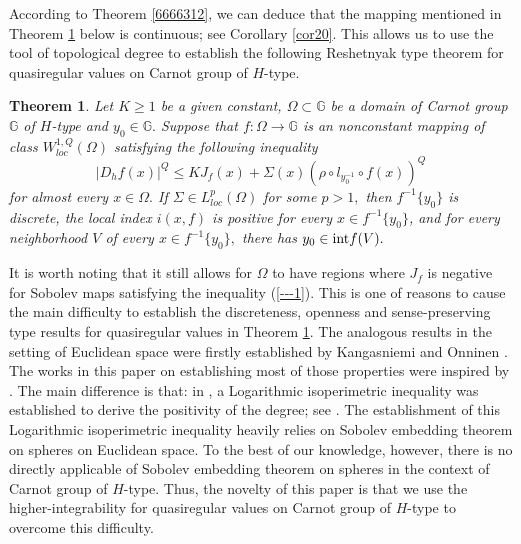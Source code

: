 \documentclass[11pt,twoside]{article}
\newtheorem{thm}{Theorem}[section]
\theoremstyle{definition}
\theoremstyle{remark}
\begin{document}
   According to Theorem \ref{6666312}, we can deduce that the mapping mentioned in Theorem \ref{00990099199} below is continuous; see Corollary \ref{cor20}.   This allows us to use the tool of topological degree
  to establish the following Reshetnyak type theorem for quasiregular values on Carnot group of $H$-type. 
  \begin{thm}\label{00990099199}
Let $K\geq1$ be a given constant, $\Omega\subset\mathbb{G}$ be a domain of Carnot group $\mathbb{G}$ of $H$-type  and $y_{0}\in\mathbb{G}.$ Suppose that $f:\Omega\rightarrow \mathbb{G}$ is an nonconstant mapping of class $W_{loc}^{1,Q}(\Omega)$  satisfying  the following inequality
\begin{equation}\label{---1}
\vert D_{h}f(x)\vert^{Q}\leq KJ_{f}(x)+\Sigma(x)(\rho\circ l_{y_{0}^{-1}}\circ f(x))^{Q}
\end{equation}
for almost every $x\in\Omega.$ If $\Sigma\in L_{loc}^{p}(\Omega)$ for some $p>1,$  then $f^{-1}\{y_{0}\}$ is discrete, the local index $i(x,f)$ is positive for every $x\in f^{-1}\{y_{0}\}$, and for every neighborhood $V$ of every  $x\in f^{-1}\{y_{0}\},$  there has $y_{0}\in {\rm int}f(V).$
\end{thm}
It is worth noting that  it still allows for $\Omega$ to have regions where $J_{f}$  is negative for Sobolev maps satisfying the inequality (\ref{---1}). This is one of reasons to cause the main difficulty to establish the discreteness, openness and sense-preserving type results for quasiregular values in Theorem \ref{00990099199}. The analogous results in the setting of Euclidean space were firstly established by Kangasniemi and  Onninen \cite[Theorem 1.2]{KO222}. The works in this paper on establishing most of those properties were inspired by \cite{KO222}.  The main difference is that: in \cite{KO222},  a Logarithmic isoperimetric inequality was established to derive the positivity of the degree; see \cite[Lemma 4.1]{KO222}. The establishment of this Logarithmic isoperimetric inequality heavily relies  on Sobolev embedding theorem on spheres on Euclidean space. To the best of our knowledge, however, there is no directly applicable of Sobolev embedding theorem on spheres in the context of Carnot group of $H$-type. Thus, the novelty of this paper is that we use the higher-integrability for quasiregular values on Carnot group of $H$-type to overcome this difficulty.
 
\end{document}
